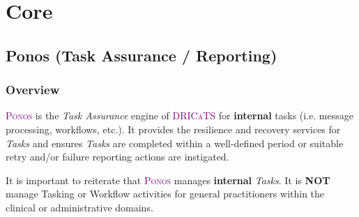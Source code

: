 \documentclass[a4paper]{book}
\newcommand{\dricats}{\textsc{\textcolor{Purple}{\small{DRICaTS }}}}
\newcommand{\ponos}{\textsc{\textcolor{Purple}{\small{Ponos }}}}
\begin{document}
\section{Core}
\subsection{Ponos (Task Assurance / Reporting)}
\subsubsection{Overview}

\ponos is the \textit{Task Assurance} engine of \dricats for \textbf{internal} tasks (i.e. message processing, workflows, etc.). It provides the resilience and recovery services for \textit{Tasks} and ensures \textit{Tasks} are completed within a well-defined period or suitable retry and/or failure reporting actions are instigated.

It is important to reiterate that \ponos manages \textbf{internal} \textit{Tasks}. It is \textbf{NOT} manage Tasking or Workflow activities for general practitioners within the clinical or administrative domains.
\end{document}
